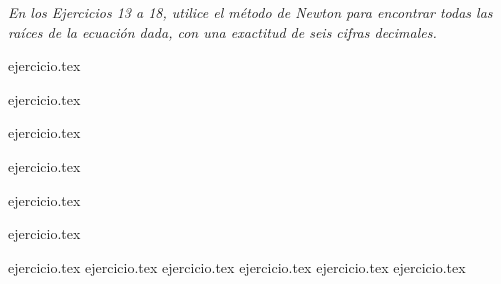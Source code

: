 \noindent \textit{En los Ejercicios 13 a 18, utilice el método de Newton para encontrar todas las raíces de la ecuación dada, con una exactitud de seis cifras decimales.}

\begin{enumerate}
    \begin{minipage}{0.45\textwidth}
    \setcounter{enumi}{12}
    {ejercicio.tex}
    \addtocounter{enumi}{1}
    {ejercicio.tex}
    \addtocounter{enumi}{1}
    {ejercicio.tex}
    \end{minipage}%
    \begin{minipage}{0.45\textwidth}
    \setcounter{enumi}{13}
    {ejercicio.tex}
    \addtocounter{enumi}{1}
    {ejercicio.tex}
    \addtocounter{enumi}{1}
    {ejercicio.tex}
    \end{minipage}
\end{enumerate}

\begin{enumerate}
    \setcounter{enumi}{18}
    {ejercicio.tex}
    {ejercicio.tex}
    {ejercicio.tex}
    {ejercicio.tex}
    {ejercicio.tex}
    {ejercicio.tex}
\end{enumerate}
